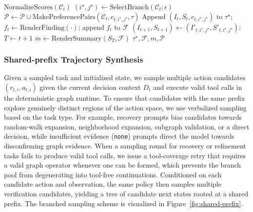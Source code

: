 \documentclass[thesis,letterpaper,12pt]{utthesis}
\begin{document}
\begin{algorithm}
\begin{algorithmic}
        \State $\mathrm{NormalizeScores}(\mathcal{C}_t)$
        \State $(i^\star, j^\star) \gets \mathrm{SelectBranch}(\mathcal{C}_t; \epsilon)$
        \State $\mathcal{P} \gets \mathcal{P} \cup \mathrm{MakePreferencePairs}(\mathcal{C}_t, c_{t,i^\star,j^\star}, \tau)$
        \State Append $(I_t, S_t, c_{t,i^\star,j^\star})$ to $\tau^\star$; \quad $f_t \gets \mathrm{RenderFinding}(\cdot)$; append $f_t$ to $\mathcal{F}$
        \State $(I_{t+1}, S_{t+1}) \gets (I'_{t,i^\star,j^\star}, S'_{t,i^\star,j^\star})$; \quad $T \gets t+1$
    \EndFor
    \State $m \gets \mathrm{RenderSummary}(S_T, \mathcal{F})$
    \State \Return $\tau^\star, \mathcal{F}, m, \mathcal{P}$
\end{algorithmic}
\end{algorithm}

\subsubsection{Shared-prefix Trajectory Synthesis}\label{sec:shared-prefix}
Given a sampled task and initialized state, we sample multiple action candidates $(r_{t,i}, a_{t,i})$ given the current decision context $D_t$ and execute valid tool calls in the deterministic graph runtime. To ensure that candidates with the same prefix explore genuinely distinct regions of the action space, we use verbalized sampling based on the task type. For example, recovery prompts bias candidates towards random-walk expansion, neighborhood expansion, subgraph validation, or a direct decision, while insufficient evidence (\texttt{none}) prompts direct the model towards disconfirming graph evidence. When a sampling round for recovery or refinement tasks fails to produce valid tool calls, we issue a tool-coverage retry that requires a valid graph operator whenever one can be formed, which prevents the branch pool from degenerating into tool-free continuations. Conditioned on each candidate action and observation, the same policy then samples multiple verification candidates, yielding a tree of candidate next states rooted at a shared prefix. The branched sampling scheme is visualized in Figure~\ref{fig:shared-prefix}.
\end{document}

